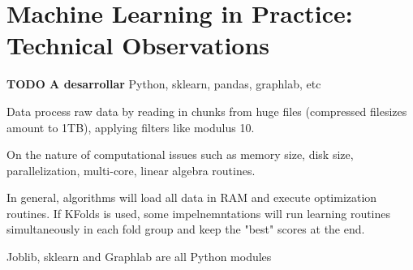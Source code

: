 \section{Machine Learning in Practice: Technical Observations}
\textbf{TODO A desarrollar}
Python, sklearn, pandas, graphlab, etc

Data process raw data by reading in chunks from huge files (compressed filesizes amount to 1TB), applying filters like modulus 10.

On the nature of computational issues such as memory size, disk size, parallelization, multi-core, linear algebra routines.

In general, algorithms will load all data in RAM and execute optimization routines. If KFolds is used, some impelnemntations will run learning routines simultaneously in each fold group and keep the "best" scores at the end.

Joblib, sklearn and Graphlab are all Python modules



